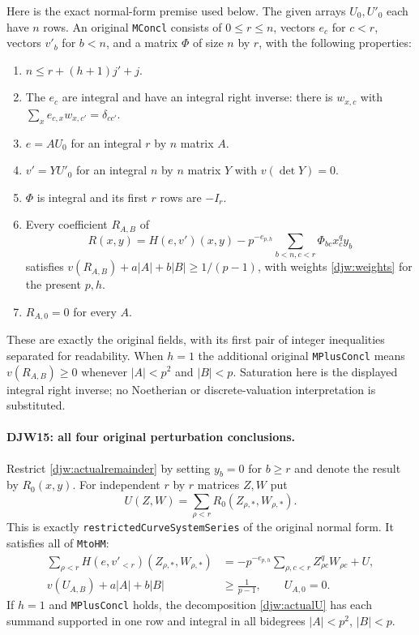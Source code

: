 \documentclass[11pt,a4paper]{article}
\numberwithin{equation}{section}
\theoremstyle{remark}\newtheorem{remark}[theorem]{Remark}
\begin{document}
Here is the exact normal-form premise used below.  The given arrays
$U_0,U'_0$ each have $n$ rows.  An original
\texttt{MConcl} consists of $0\le r\le n$, vectors $e_c$ for
$c<r$, vectors $v'_b$ for $b<n$, and a matrix $\Phi$ of size
$n$ by $r$, with the following properties:
\begin{enumerate}
\item $n\le r+(h+1)j'+j$.
\item The $e_c$ are integral and have an integral right inverse:
there is $w_{x,c}$ with
$\sum_x e_{c,x}w_{x,c'}=\delta_{cc'}$.
\item $e=A U_0$ for an integral $r$ by $n$ matrix $A$.
\item $v'=Y U'_0$ for an integral $n$ by $n$ matrix $Y$ with
$v(\det Y)=0$.
\item $\Phi$ is integral and its first $r$ rows are $-I_r$.
\item Every coefficient $R_{A,B}$ of
\begin{equation}
 R(x,y)=H(e,v')(x,y)
        -p^{-e_{p,h}}\sum_{b<n,c<r}\Phi_{bc}x_c^q y_b
 \label{djw:actualremainder}
\end{equation}
satisfies
$v(R_{A,B})+a|A|+b|B|\ge1/(p-1)$, with weights
\eqref{djw:weights} for the present $p,h$.
\item $R_{A,0}=0$ for every $A$.
\end{enumerate}
These are exactly the original fields, with its first pair of
integer inequalities separated for readability.  When $h=1$ the
additional original \texttt{MPlus\allowbreak Concl} means
$v(R_{A,B})\ge0$ whenever $|A|<p^2$ and $|B|<p$.
Saturation here is the displayed integral right inverse; no
Noetherian or discrete-valuation interpretation is substituted.

\paragraph{DJW15: all four original perturbation conclusions.}
\label{claim:DJW15}
Restrict \eqref{djw:actualremainder} by setting $y_b=0$ for
$b\ge r$ and denote the result by $R_0(x,y)$.
For independent $r$ by $r$ matrices $Z,W$ put
\begin{equation}
 U(Z,W)=\sum_{\rho<r}R_0(Z_{\rho,*},W_{\rho,*}).
 \label{djw:actualU}
\end{equation}
This is exactly
\texttt{restricted\allowbreak Curve\allowbreak System\allowbreak Series} of the original normal form.
It satisfies all of \texttt{Mto\allowbreak HM}:
\begin{align}
 \sum_{\rho<r}H(e,v'_{<r})(Z_{\rho,*},W_{\rho,*})
   &=-p^{-e_{p,h}}\sum_{\rho,c<r}Z_{\rho c}^qW_{\rho c}+U,
        \label{djw:actualmain}\\
 v(U_{A,B})+a|A|+b|B|&\ge\frac1{p-1},\qquad U_{A,0}=0.
        \label{djw:actualHM}
\end{align}
If $h=1$ and \texttt{MPlus\allowbreak Concl} holds, the decomposition
\eqref{djw:actualU} has each summand supported in one row and
integral in all bidegrees $|A|<p^2$, $|B|<p$.
\end{document}
